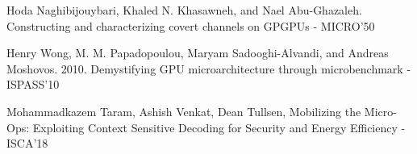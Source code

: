 \documentclass[10pt]{beamer}
\begin{document}
\begin{frame}[allowframebreaks]
\begin{thebibliography}{10}
            Hoda Naghibijouybari, Khaled N. Khasawneh, and Nael Abu-Ghazaleh. Constructing and characterizing covert channels on GPGPUs - MICRO'50

            Henry Wong, M. M. Papadopoulou, Maryam Sadooghi-Alvandi, and Andreas Moshovos. 2010. Demystifying GPU microarchitecture through microbenchmark - ISPASS'10

        Mohammadkazem Taram, Ashish Venkat, Dean Tullsen, Mobilizing the Micro-Ops: Exploiting Context Sensitive Decoding for Security and Energy Efficiency - ISCA'18
    \end{thebibliography}
\end{frame}

\end{document}
